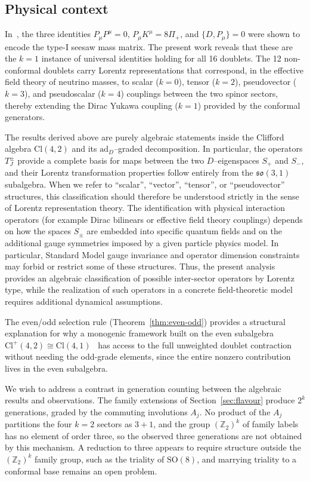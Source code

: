 \documentclass{birkjour}
\theoremstyle{definition}
\theoremstyle{remark}
\numberwithin{equation}{section}
\newcommand{\Cl}{\mathrm{Cl}}
\newcommand{\so}{\mathfrak{so}}
\newcommand{\Z}{\mathbb{Z}}
\newcommand{\ad}{\mathrm{ad}}
\providecommand{\rev}{{}}
\newenvironment{revblock}{}{}
\begin{document}
\subsection{Physical context}

In~\cite{Hansen2026seesaw}, the three identities
$P_\mu P^\mu=0$, $P_\mu K^\mu=8\Pi_+$, and $\{D,P_\mu\}=0$
were shown to encode the type-I seesaw mass matrix.
The present work reveals that these are the $k=1$ instance
of universal identities holding for all 16 doublets.
The 12 non-conformal doublets carry Lorentz representations
that correspond, in the effective field theory of neutrino
masses, to scalar ($k=0$), tensor ($k=2$), pseudovector
($k=3$), and pseudoscalar ($k=4$) couplings between the
two spinor sectors, thereby extending the Dirac Yukawa coupling
($k=1$) provided by the conformal generators.


The results derived above are purely algebraic statements inside the
Clifford algebra $\Cl(4,2)$ and its $\ad_D$–graded decomposition.
In particular, the operators $T_J^\pm$ provide a complete basis for
maps between the two $D$–eigenspaces $S_+$ and $S_-$,
and their Lorentz transformation properties follow entirely from the
$\so(3,1)$ subalgebra.
When we refer to ``scalar'', ``vector'', ``tensor'', or ``pseudovector''
structures, this classification should therefore be understood strictly
in the sense of Lorentz representation theory.
The identification with physical interaction operators (for example
Dirac bilinears or effective field theory couplings) depends on how the
spaces $S_\pm$ are embedded into specific quantum fields and on the
additional gauge symmetries imposed by a given particle physics model.
In particular, Standard Model gauge invariance and operator dimension
constraints may forbid or restrict some of these structures.
Thus, the present analysis provides an algebraic classification of
possible inter-sector operators by Lorentz type, while the realization
of such operators in a concrete field-theoretic model requires
additional dynamical assumptions.

The even/odd selection rule
(Theorem~\ref{thm:even-odd}) provides a structural
explanation for why \rev{a monogenic framework built on the
even subalgebra $\Cl^+(4,2)\cong\Cl(4,1)$~\cite{Almeida2006}
has access to the full unweighted doublet contraction}
without needing the odd-grade elements, since the entire
nonzero contribution lives in the even subalgebra.

\begin{revblock}
We wish to address a contrast in generation counting
between the algebraic results and observations. The
family extensions of Section~\ref{sec:flavour} produce
$2^k$ generations, graded by the commuting involutions
$A_j$. No product of the $A_j$ partitions the four $k=2$
sectors as $3+1$, and the group $(\Z_2)^k$ of family labels
has no element of order three, so the observed three
generations are not obtained by this mechanism. A reduction
to three appears to require structure outside the
$(\Z_2)^k$ family group, such as the triality of
$\mathrm{SO}(8)$, and marrying triality to a conformal base
remains an open problem. 
\end{revblock}
\end{document}
